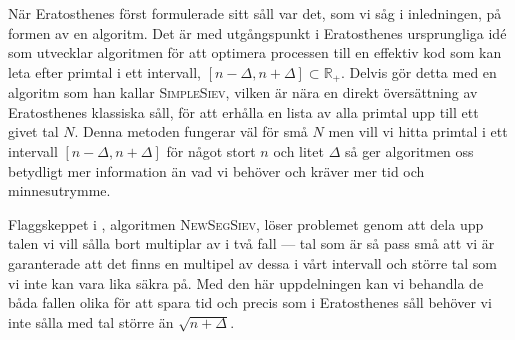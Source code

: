 


När Eratosthenes först formulerade sitt såll var det, som vi såg i inledningen, på formen av en algoritm. Det är med utgångspunkt i Eratosthenes ursprungliga idé som \cite{HaraldSieve} utvecklar algoritmen för att optimera processen till en effektiv kod som kan leta efter primtal i ett intervall, $[n - \Delta, n + \Delta] \subset \mathbb{R}_+$. Delvis gör \cite{HaraldSieve} detta med en algoritm som han kallar \textsc{SimpleSiev}, vilken är nära en direkt översättning av Eratosthenes klassiska såll, för att erhålla en lista av alla primtal upp till ett givet tal $N$. Denna metoden fungerar väl för små $N$ men vill vi hitta primtal i ett intervall $[n - \Delta, n + \Delta]$ för något stort $n$ och litet $\Delta$ så ger algoritmen oss betydligt mer information än vad vi behöver och kräver mer tid och minnesutrymme. 

Flaggskeppet i \cite{HaraldSieve}, algoritmen \textsc{NewSegSiev}, löser problemet genom att dela upp talen vi vill sålla bort multiplar av i två fall --- tal som är så pass små att vi är garanterade att det finns en multipel av dessa i vårt intervall och större tal som vi inte kan vara lika säkra på. Med den här uppdelningen kan vi behandla de båda fallen olika för att spara tid och precis som i Eratosthenes såll behöver vi inte sålla med tal större än \(\sqrt{n + \Delta}\). 

